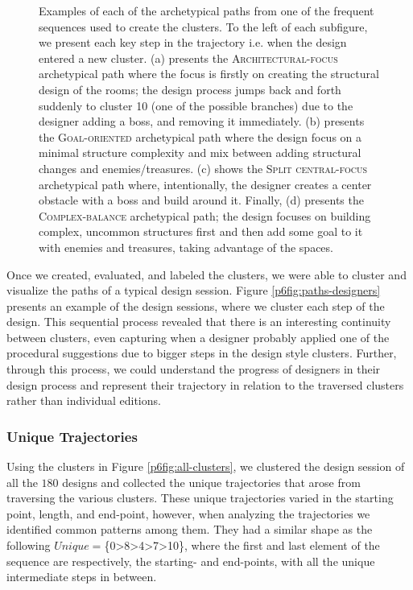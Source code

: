 \begin{figure}[t]
    \caption{Examples of each of the archetypical paths from one of the frequent sequences used to create the clusters. To the left of each subfigure, we present each key step in the trajectory i.e. when the design entered a new cluster. (a) presents the \textsc{Architectural-focus} archetypical path where the focus is firstly on creating the structural design of the rooms; the design process jumps back and forth suddenly to cluster 10 (one of the possible branches) due to the designer adding a boss, and removing it immediately. (b) presents the \textsc{Goal-oriented} archetypical path where the design focus on a minimal structure complexity and mix between adding structural changes and enemies/treasures. (c) shows the \textsc{Split central-focus} archetypical path where, intentionally, the designer creates a center obstacle with a boss and build around it. Finally, (d) presents the \textsc{Complex-balance} archetypical path; the design focuses on building complex, uncommon structures first and then add some goal to it with enemies and treasures, taking advantage of the spaces.}
    \label{p6fig:archetypical-examples}
\end{figure}


Once we created, evaluated, and labeled the clusters, we were able to cluster and visualize the paths of a typical design session. Figure \ref{p6fig:paths-designers} presents an example of the design sessions, where we cluster each step of the design. This sequential process revealed that there is an interesting continuity between clusters, even capturing when a designer probably applied one of the procedural suggestions due to bigger steps in the design style clusters. Further, through this process, we could understand the progress of designers in their design process and represent their trajectory in relation to the traversed clusters rather than individual editions.

\subsubsection{Unique Trajectories}

Using the clusters in Figure \ref{p6fig:all-clusters}, we clustered the design session of all the $180$ designs and collected the unique trajectories that arose from traversing the various clusters. These unique trajectories varied in the starting point, length, and end-point, however, when analyzing the trajectories we identified common patterns among them. They had a similar shape as the following $Unique=$\{0\textgreater8\textgreater4\textgreater7\textgreater10\}, where the first and last element of the sequence are respectively, the starting- and end-points, with all the unique intermediate steps in between.


